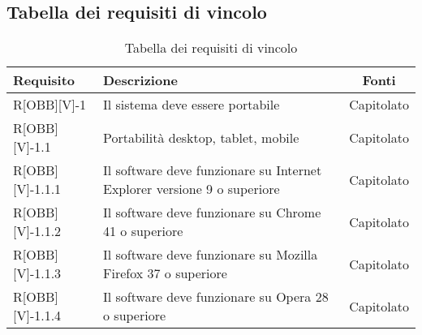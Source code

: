 \subsection{Tabella dei requisiti di vincolo}

\begin{center}
	\begin{table}[h]
	\begin{tabular}{|l|p{}|c|}
		\toprule
		
		\textbf{Requisito} & \textbf{Descrizione} & \textbf{Fonti} \\
		
		\midrule
		R[OBB][V]-1 & Il sistema deve essere portabile & Capitolato \\ \midrule
		R[OBB][V]-1.1 &	Portabilità desktop, tablet, mobile	& Capitolato\\  \midrule
		R[OBB][V]-1.1.1	& Il software deve funzionare su Internet Explorer versione 9 o superiore & Capitolato \\ \midrule
		R[OBB][V]-1.1.2	& Il software deve funzionare su Chrome 41 o superiore & Capitolato \\ \midrule
		R[OBB][V]-1.1.3 & Il software deve funzionare su Mozilla Firefox 37 o superiore & Capitolato  \\ \midrule
		R[OBB][V]-1.1.4	& Il software deve funzionare su Opera 28 o superiore & Capitolato \\

		\bottomrule
		
	\end{tabular}
	\caption{Tabella dei requisiti di vincolo}
	
	\end{table}
	
\end{center}

\newpage

